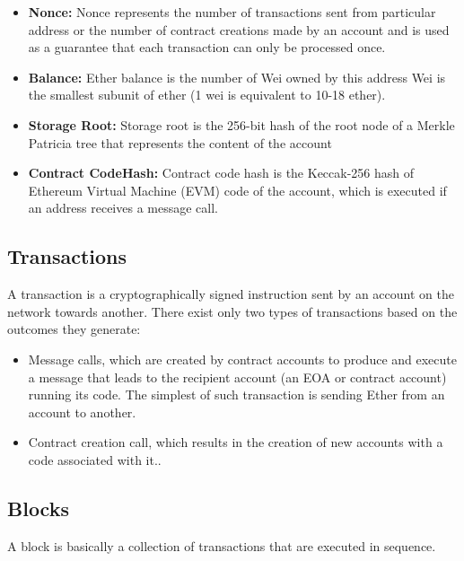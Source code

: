         \begin{itemize}
            \item \textbf{Nonce:} Nonce represents the number of transactions sent from particular address or the number of contract creations made by an account and is used as a guarantee that each transaction can only be processed once.
            \item \textbf{Balance:} Ether balance is the number of Wei owned by this address
                Wei is the smallest subunit of ether (1 wei is equivalent to 10-18 ether).
            \item \textbf{Storage Root:} Storage root is the 256-bit hash of the root node of a Merkle Patricia tree that represents the content of the account 
            \item \textbf{Contract CodeHash:} Contract code hash is the Keccak-256 hash of Ethereum Virtual Machine (EVM) code of the account, which is executed if an address receives a message call.
        \end{itemize}

    \subsection{Transactions}
    A transaction is a cryptographically signed instruction sent by an account on the network towards another.
    There exist only two types of transactions based on the outcomes they generate:
    \begin{itemize}
        \item Message calls, which are created by contract accounts to produce and execute a message that leads to the recipient account (an EOA or contract account) running its code. The simplest of such transaction is sending Ether from an account to another.
        \item Contract creation call, which results in the creation of new accounts with a code associated with it..
    \end{itemize}

    \subsection{Blocks}
    A block is basically a collection of transactions that are executed in sequence.
    


